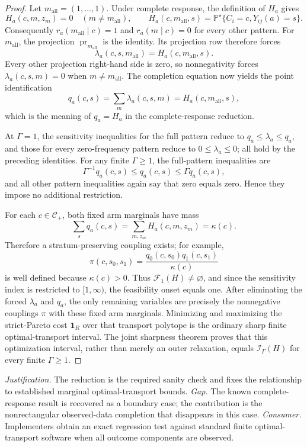 \documentclass{article}
\begin{document}
\begin{proof}
Let \(m_{\mathrm{all}}=(1,\ldots,1)\).  Under complete response, the definition of \(H_a\) gives
\[
H_a(c,m,z_m)=0\quad(m\ne m_{\mathrm{all}}),
\qquad
H_a(c,m_{\mathrm{all}},s)
=\mathbb P^{\star}\{C_i=c,Y_{ij}(a)=s\}.
\]
Consequently \(r_a(m_{\mathrm{all}}\mid c)=1\) and \(r_a(m\mid c)=0\) for every other pattern.  For \(m_{\mathrm{all}}\), the projection \(\operatorname{pr}_{m_{\mathrm{all}}}\) is the identity.  Its projection row therefore forces
\[
\lambda_a(c,s,m_{\mathrm{all}})=H_a(c,m_{\mathrm{all}},s).
\]
Every other projection right-hand side is zero, so nonnegativity forces \(\lambda_a(c,s,m)=0\) when \(m\ne m_{\mathrm{all}}\).  The completion equation now yields the point identification
\[
q_a(c,s)=\sum_m\lambda_a(c,s,m)
=H_a(c,m_{\mathrm{all}},s),
\]
which is the meaning of \(q_a=H_a\) in the complete-response reduction.

At \(\Gamma=1\), the sensitivity inequalities for the full pattern reduce to \(q_a\le\lambda_a\le q_a\), and those for every zero-frequency pattern reduce to \(0\le\lambda_a\le0\); all hold by the preceding identities.  For any finite \(\Gamma\ge1\), the full-pattern inequalities are
\[
\Gamma^{-1}q_a(c,s)\le q_a(c,s)\le\Gamma q_a(c,s),
\]
and all other pattern inequalities again say that zero equals zero.  Hence they impose no additional restriction.

For each \(c\in\mathcal C_+\), both fixed arm marginals have mass
\[
\sum_s q_a(c,s)=\sum_{m,z_m}H_a(c,m,z_m)=\kappa(c).
\]
Therefore a stratum-preserving coupling exists; for example,
\[
\pi(c,s_0,s_1)=
\frac{q_0(c,s_0)q_1(c,s_1)}{\kappa(c)}
\]
is well defined because \(\kappa(c)>0\).  Thus \(\mathcal F_1(H)\ne\varnothing\), and since the sensitivity index is restricted to \([1,\infty)\), the feasibility onset equals one.  After eliminating the forced \(\lambda_a\) and \(q_a\), the only remaining variables are precisely the nonnegative couplings \(\pi\) with these fixed arm marginals.  Minimizing and maximizing the strict-Pareto cost \(\mathbf 1_R\) over that transport polytope is the ordinary sharp finite optimal-transport interval.  The joint sharpness theorem proves that this optimization interval, rather than merely an outer relaxation, equals \(\mathcal I_{\Gamma}(H)\) for every finite \(\Gamma\ge1\).
\end{proof}
\par\smallskip\noindent \textit{Justification.} The reduction is the required sanity check and fixes the relationship to established marginal optimal-transport bounds. \textit{Gap.} The known complete-response result is recovered as a boundary case; the contribution is the nonrectangular observed-data completion that disappears in this case. \textit{Consumer.} Implementers obtain an exact regression test against standard finite optimal-transport software when all outcome components are observed.
\end{document}

